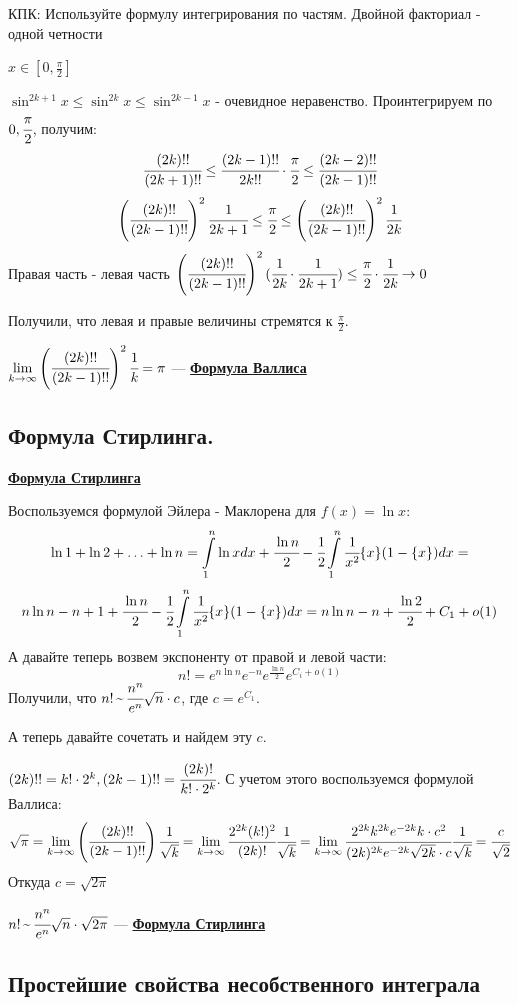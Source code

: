 \documentclass{article}
\newcommand{\integral}[2]{\displaystyle\int\limits_{#1}^{#2}}
\newcommand{\deff}[1]{\underline{\textbf{#1}}}
\newcommand{\thmm}[1]{\underline{\textbf{#1}}}
\newcommand{\mytilde}{\raisebox{0.5ex}{\texttildelow}}
\begin{document}
КПК: Используйте формулу интегрирования по частям. Двойной факториал - одной четности

$x\in [0,\frac{\pi}{2}]$

$\sin^{2k+1} x\leq \sin^{2k}x\leq \sin^{2k-1}x$ - очевидное неравенство. Проинтегрируем по $0,\cfrac{\pi}{2}$, получим:
$$\cfrac{(2k)!!}{(2k+1)!!}\leq \cfrac{(2k-1)!!}{2k!!}\cdot \cfrac{\pi}{2}\leq \cfrac{(2k-2)!!}{(2k-1)!!}$$
$$\left(\cfrac{(2k)!!}{(2k-1)!!}\right)^2\cfrac{1}{2k+1} \leq \cfrac{\pi}{2}\leq \left(\cfrac{(2k)!!}{(2k-1)!!}\right)^2\cfrac{1}{2k}$$
Правая часть - левая часть $\left(\cfrac{(2k)!!}{(2k-1)!!}\right)^2(\cfrac{1}{2k}\cdot\cfrac{1}{2k+1})\leq \cfrac{\pi}{2}\cdot \cfrac{1}{2k} \rightarrow 0$

Получили, что левая и правые величины стремятся к $\frac{\pi}{2}$.

$\lim\limits_{k\rightarrow\infty}\left(\cfrac{(2k)!!}{(2k-1)!!}\right)^2\cfrac{1}{k} = \pi$ --- \deff{Формула Валлиса}

\subsection{Формула Стирлинга.}
\thmm{Формула Стирлинга}

Воспользуемся формулой Эйлера - Маклорена для $f(x) = \ln x$:
$$\ln 1 + \ln 2 + \ldots + \ln n = \integral{1}{n}\ln x dx +\cfrac{\ln n }{2} - \cfrac{1}{2}\integral{1}{n}\cfrac{1}{x^2}\{x\}(1-\{x\})dx = $$
$$n\ln n - n + 1 +\cfrac{\ln n}{2} - \cfrac{1}{2}\integral{1}{n}\cfrac{1}{x^2}\{x\}(1-\{x\})dx = n \ln n - n +\cfrac{\ln 2}{2} +C_1 + o(1)$$
А давайте теперь возвем экспоненту от правой и левой части:
$$n! = e^{n\ln n}e^{-n}e^\frac{\ln n}{2} e^{C_i + o(1)}$$
Получили, что $n!\, \mytilde\, \cfrac{n^n}{e^n}\sqrt{n}\cdot c$, где $c = e^{C_1}$.

А теперь давайте сочетать и найдем эту $c$.

$(2k)!! = k!\cdot 2^k, (2k-1)!! = \cfrac{(2k)!}{k!\cdot2^k}$. С учетом этого воспользуемся формулой Валлиса:
$$\sqrt{\pi} = \lim\limits_{k\rightarrow\infty}\left(\cfrac{(2k)!!}{(2k-1)!!}\right)\cfrac{1}{\sqrt{k}}=\lim_{k\rightarrow \infty}\cfrac{2^{2k}(k!)^2}{(2k)!}\cfrac{1}{\sqrt{k}} = \lim_{k\rightarrow \infty} \cfrac{2^{2k}k^{2k}e^{-2k}k\cdot c^2}{(2k)^{2k}e^{-2k}\sqrt{2k}\cdot c}\cfrac{1}{\sqrt{k}} = \cfrac{c}{\sqrt{2}}$$
Откуда $c = \sqrt{2\pi}$

$n!\, \mytilde\, \cfrac{n^n}{e^n}\sqrt{n}\cdot \sqrt{2\pi}$ --- \deff{Формула Стирлинга}
\subsection{Простейшие свойства несобственного интеграла}
\end{document}
